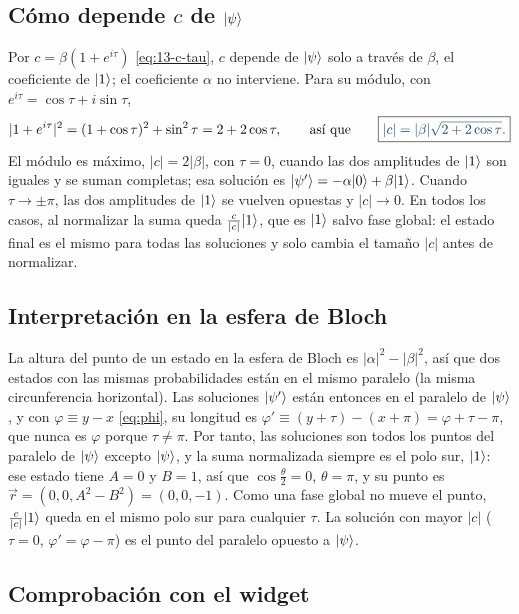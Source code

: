 \subsection*{Cómo depende $c$ de $\lvert \psi\rangle$}

Por $c=\beta(1+e^{i\tau})$ \eqref{eq:13-c-tau}, $c$ depende de $\lvert \psi\rangle$ solo a través de
$\beta$, el coeficiente de $\lvert 1\rangle$; el coeficiente $\alpha$ no interviene. Para su módulo, con
$e^{i\tau}=\cos\tau+i\sin\tau$,
\[
  |1+e^{i\tau}|^2=(1+\cos\tau)^2+\sin^2\tau=2+2\cos\tau,
  \qquad\text{así que}\qquad
  \destacado{|c|=|\beta|\sqrt{2+2\cos\tau}.}
\]
El módulo es máximo, $|c|=2|\beta|$, con $\tau=0$, cuando las dos amplitudes de $\lvert 1\rangle$ son
iguales y se suman completas; esa solución es $\lvert \psi'\rangle=-\alpha\lvert 0\rangle+\beta\lvert 1\rangle$. Cuando
$\tau\to\pm\pi$, las dos amplitudes de $\lvert 1\rangle$ se vuelven opuestas y $|c|\to0$. En todos los
casos, al normalizar la suma queda $\frac{c}{|c|}\lvert 1\rangle$, que es $\lvert 1\rangle$ salvo fase global: el
estado final es el mismo para todas las soluciones y solo cambia el tamaño $|c|$ antes de
normalizar.

\subsection*{Interpretación en la esfera de Bloch}

La altura del punto de un estado en la esfera de Bloch es $|\alpha|^2-|\beta|^2$, así que dos
estados con las mismas probabilidades están en el mismo paralelo (la misma circunferencia
horizontal). Las soluciones $\lvert \psi'\rangle$ están entonces en el paralelo de $\lvert \psi\rangle$, y con
$\varphi\equiv y-x$ \eqref{eq:phi}, su longitud es
$\varphi'\equiv(y+\tau)-(x+\pi)=\varphi+\tau-\pi$, que nunca es $\varphi$ porque $\tau\neq\pi$.
Por tanto, las soluciones son todos los puntos del paralelo de $\lvert \psi\rangle$ excepto $\lvert \psi\rangle$, y
la suma normalizada siempre es el polo sur, $\lvert 1\rangle$: ese estado tiene $A=0$ y $B=1$, así que $\cos\frac\theta2=0$, $\theta=\pi$, y su punto es $\vec r=(0,0,A^2-B^2)=(0,0,-1)$. Como una fase global no mueve el punto, $\frac{c}{|c|}\lvert 1\rangle$ queda en el mismo polo sur para cualquier $\tau$. La solución con mayor $|c|$ ($\tau=0$,
$\varphi'=\varphi-\pi$) es el punto del paralelo opuesto a $\lvert \psi\rangle$.

\subsection*{Comprobación con el widget}

